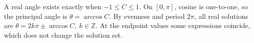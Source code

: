 A real angle exists exactly when $-1\le C\le1$. On $[0,\pi]$, cosine is one-to-one, so the principal angle is $\boxed{\theta=\arccos C}$. By evenness and period $2\pi$, all real solutions are $\boxed{\theta=2k\pi\pm\arccos C,\ k\in\mathbb Z}$. At the endpoint values some expressions coincide, which does not change the solution set.
